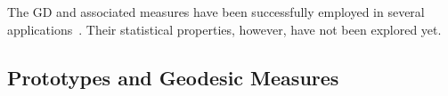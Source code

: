 \documentclass[journal]{IEEEtran}
\begin{document}
The GD and associated measures have been successfully employed in several applications~\cite{ClassificationPolSARGeodesic,AGeneralizedVolumeScatteringModelBasedVegetationIndexfromPolarimetricSARData2019,NovelTechniquesforBuiltupAreaExtractionfromPolarimetricSARImages2019,APolSARScatteringPowerFactorizationFrameworkandNovelRollInvariantParametersBasedUnsupervisedClassificationSchemeUsingaGeodesicDistanceinpress,ChangeDetectionPolSARGeodesicDistanceBetweenScatteringMechanisms,ARadarVegetationIndexforCropMonitoringUsingCompactPolarimetricSARData}. Their statistical properties, however, have not been explored yet.

\subsection{Prototypes and Geodesic Measures}
\end{document}
